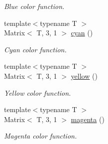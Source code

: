 \begin{DoxyCompactItemize}
\begin{DoxyCompactList}\small\item\em Blue color function. \end{DoxyCompactList}\item 
\hypertarget{group___primary_colors_gac171b7ffb96afd731cdb154a9eb41f1c}{{\footnotesize template$<$typename T $>$ }\\Matrix$<$ T, 3, 1 $>$ \hyperlink{group___primary_colors_gac171b7ffb96afd731cdb154a9eb41f1c}{cyan} ()}\label{group___primary_colors_gac171b7ffb96afd731cdb154a9eb41f1c}

\begin{DoxyCompactList}\small\item\em Cyan color function. \end{DoxyCompactList}\item 
\hypertarget{group___primary_colors_ga03c463032ad2ac98a3661c1801fea9cb}{{\footnotesize template$<$typename T $>$ }\\Matrix$<$ T, 3, 1 $>$ \hyperlink{group___primary_colors_ga03c463032ad2ac98a3661c1801fea9cb}{yellow} ()}\label{group___primary_colors_ga03c463032ad2ac98a3661c1801fea9cb}

\begin{DoxyCompactList}\small\item\em Yellow color function. \end{DoxyCompactList}\item 
\hypertarget{group___primary_colors_gadfcf6ebbbe83635103749fc438e1b4a0}{{\footnotesize template$<$typename T $>$ }\\Matrix$<$ T, 3, 1 $>$ \hyperlink{group___primary_colors_gadfcf6ebbbe83635103749fc438e1b4a0}{magenta} ()}\label{group___primary_colors_gadfcf6ebbbe83635103749fc438e1b4a0}

\begin{DoxyCompactList}\small\item\em Magenta color function. \end{DoxyCompactList}\end{DoxyCompactItemize}
